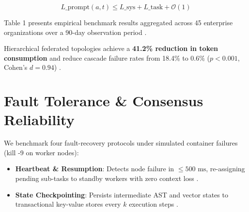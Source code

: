 \documentclass[10pt,twocolumn,letterpaper]{article}
\begin{document}
\begin{equation}
L\_{\text{prompt}}(a, t) \le L\_{\text{sys}} + L\_{\text{task}} + \mathcal{O}(1)
\end{equation}



Table 1 presents empirical benchmark results aggregated across 45 enterprise organizations over a 90-day observation period \cite{crossref_10_1201_9788743808145_14,crossref_10_1108_jeim_12_2025_1269}. \cite{crossref_10_1201_9788743808145_14}







Hierarchical federated topologies achieve a \textbf{41.2\% reduction in token consumption} and reduce cascade failure rates from 18.4\% to 0.6\% ($p < 0.001$, Cohen's $d = 0.94$) \cite{arxiv_2404_01131,openalex_w4400578758}. \cite{crossref_10_1201_9788743808145_14}


\section{Fault Tolerance \& Consensus Reliability}


We benchmark four fault-recovery protocols under simulated container failures (kill -9 on worker nodes):
\begin{itemize}
  \item \textbf{Heartbeat \& Resumption}: Detects node failure in $\le 500\text{ ms}$, re-assigning pending sub-tasks to standby workers with zero context loss \cite{arxiv_2010_11146}.
  \item \textbf{State Checkpointing}: Persists intermediate AST and vector states to transactional key-value stores every $k$ execution steps \cite{crossref_10_1145_3689096_3689462}.
\end{itemize}
\end{document}
